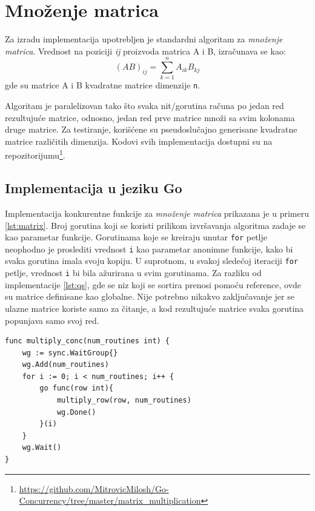 \documentclass[12pt,oneside]{memoir}
\begin{document}
\section{Množenje matrica}
Za izradu implementacija upotrebljen je standardni algoritam za \textit{množenje matrica}. Vrednost na poziciji \textit{ij} proizvoda matrica A i B, izračunava se kao: $$(AB)_{ij} = \sum_{k=1}^{n} A_{ik}B_{kj}$$ gde su matrice A i B kvadratne matrice dimenzije \texttt{n}.

Algoritam je paralelizovan tako što svaka nit/gorutina računa po jedan red rezultujuće matrice, odnosno, jedan red prve matrice množi sa svim kolonama druge matrice. Za testiranje, korišćene su pseudoslučajno generisane kvadratne matrice različitih dimenzija. Kodovi svih implementacija dostupni su na repozitorijumu\footnote{\url{https://github.com/MitrovicMilosh/Go-Concurrency/tree/master/matrix_multiplication}}.

\subsection{Implementacija u jeziku Go}
Implementacija konkurentne funkcije za \textit{množenje matrica} prikazana je u primeru \ref{lst:matrix}. Broj gorutina koji se koristi prilikom izvršavanja algoritma zadaje se kao parametar funkcije. Gorutinama koje se kreiraju unutar \texttt{for} petlje neophodno je proslediti vrednost \texttt{i} kao parametar anonimne funkcije, kako bi svaka gorutina imala svoju kopiju. U suprotnom, u svakoj sledećoj iteraciji \texttt{for} petlje, vrednost \texttt{i} bi bila ažurirana u svim gorutinama. Za razliku od  implementacije \ref{lst:qs}, gde se niz koji se sortira prenosi pomoću reference, ovde su matrice definisane kao globalne. Nije potrebno nikakvo zaključavanje jer se ulazne matrice koriste samo za čitanje, a kod rezultujuće matrice svaka gorutina popunjava samo svoj red. 

\begin{center}
\begin{lstlisting}[caption=Implementacija konkurentne funkcije za \textit{množenje matrica} u jeziku Go,label={lst:matrix}, backgroundcolor=\color{background}]
func multiply_conc(num_routines int) {
	wg := sync.WaitGroup{}
	wg.Add(num_routines)
	for i := 0; i < num_routines; i++ {
		go func(row int){
			multiply_row(row, num_routines)
			wg.Done()
		}(i)
	}
	wg.Wait()
}
\end{lstlisting}
\end{center}
\end{document}

